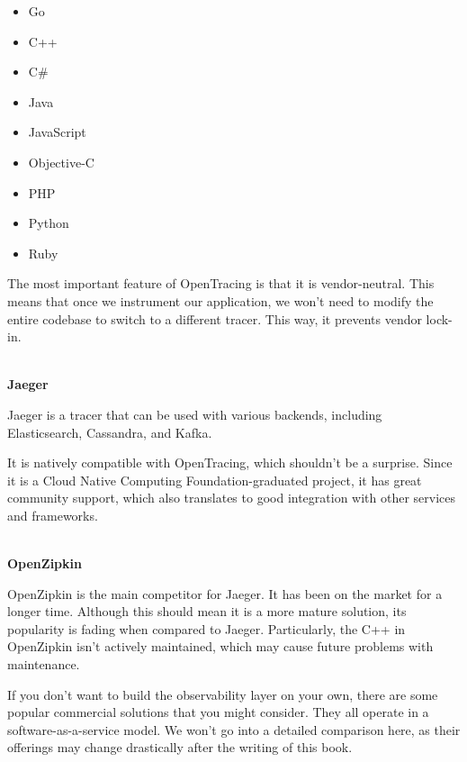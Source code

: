 \begin{itemize}
\item 
Go

\item 
C++

\item 
C\#

\item 
Java

\item 
JavaScript

\item 
Objective-C

\item 
PHP

\item 
Python

\item 
Ruby
\end{itemize}

The most important feature of OpenTracing is that it is vendor-neutral. This means that once we instrument our application, we won’t need to modify the entire codebase to switch to a different tracer. This way, it prevents vendor lock-in.

\hspace*{\fill} \\ %
\noindent
\textbf{Jaeger}

Jaeger is a tracer that can be used with various backends, including Elasticsearch, Cassandra, and Kafka.

It is natively compatible with OpenTracing, which shouldn't be a surprise. Since it is a Cloud Native Computing Foundation-graduated project, it has great community support, which also translates to good integration with other services and frameworks.

\hspace*{\fill} \\ %
\noindent
\textbf{OpenZipkin}

OpenZipkin is the main competitor for Jaeger. It has been on the market for a longer time. Although this should mean it is a more mature solution, its popularity is fading when compared to Jaeger. Particularly, the C++ in OpenZipkin isn't actively maintained, which may cause future problems with maintenance.


If you don't want to build the observability layer on your own, there are some popular commercial solutions that you might consider. They all operate in a software-as-a-service model. We won't go into a detailed comparison here, as their offerings may change drastically after the writing of this book.

